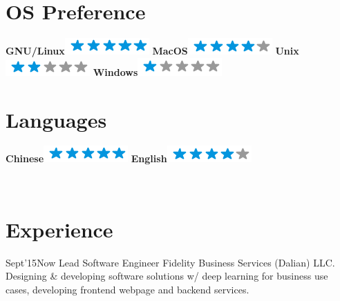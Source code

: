 \documentclass[]{lubricy-cv}
\begin{document}
\begin{aside}
  \section{OS Preference}
    \textbf{GNU/Linux}\includegraphics[scale=0.40]{img/5stars.png}
    \textbf{MacOS}\includegraphics[scale=0.40]{img/4stars.png}
    \textbf{Unix}\includegraphics[scale=0.40]{img/2stars.png}
    \textbf{Windows}\includegraphics[scale=0.40]{img/1stars.png}
    ~
  \section{Languages}
    \textbf{Chinese}\includegraphics[scale=0.40]{img/5stars.png}
    \textbf{English}\includegraphics[scale=0.40]{img/4stars.png}
    ~
\end{aside}
~
\section{Experience}
\begin{entrylist}
  \entry
    {Sept'15}{Now}
    {Lead Software Engineer}
    {Fidelity Business Services (Dalian) LLC.}
    {Designing \& developing software solutions w/ deep learning for business use cases,
      developing frontend webpage and backend services. }
    {}
\end{entrylist}
~
\end{document}

